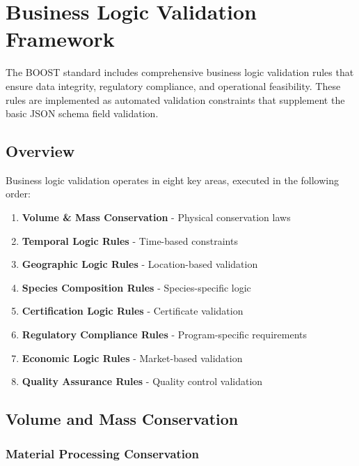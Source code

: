 
\section{Business Logic Validation Framework}
\label{sec:business-logic-validation}

The BOOST standard includes comprehensive business logic validation rules that ensure data integrity, regulatory compliance, and operational feasibility. These rules are implemented as automated validation constraints that supplement the basic JSON schema field validation.

\subsection{Overview}
\label{sec:business-logic-overview}

Business logic validation operates in eight key areas, executed in the following order:
\begin{enumerate}
    \item \textbf{Volume \& Mass Conservation} - Physical conservation laws
    \item \textbf{Temporal Logic Rules} - Time-based constraints
    \item \textbf{Geographic Logic Rules} - Location-based validation
    \item \textbf{Species Composition Rules} - Species-specific logic
    \item \textbf{Certification Logic Rules} - Certificate validation
    \item \textbf{Regulatory Compliance Rules} - Program-specific requirements
    \item \textbf{Economic Logic Rules} - Market-based validation
    \item \textbf{Quality Assurance Rules} - Quality control validation
\end{enumerate}

\subsection{Volume and Mass Conservation}
\label{sec:volume-mass-conservation}

\subsubsection{Material Processing Conservation}

